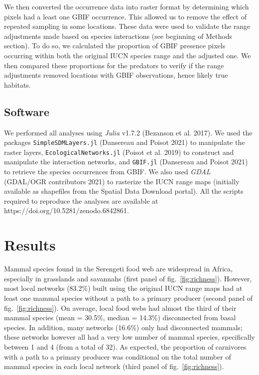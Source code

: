 \documentclass[10pt,oneside]{article}
\begin{document}
We then converted the occurrence data into raster format by determining
which pixels had a least one GBIF occurrence. This allowed us to remove
the effect of repeated sampling in some locations. These data were used
to validate the range adjustments made based on species interactions
(see beginning of Methods section). To do so, we calculated the
proportion of GBIF presence pixels occurring within both the original
IUCN species range and the adjusted one. We then compared these
proportions for the predators to verify if the range adjustments removed
locations with GBIF observations, hence likely true habitats.

\hypertarget{software}{%
\subsection{Software}\label{software}}

We performed all analyses using \emph{Julia} v1.7.2 (Bezanson et al.
2017). We used the packages \texttt{SimpleSDMLayers.jl} (Dansereau and
Poisot 2021) to manipulate the raster layers,
\texttt{EcologicalNetworks.jl} (Poisot et al. 2019) to construct and
manipulate the interaction networks, and \texttt{GBIF.jl} (Dansereau and
Poisot 2021) to retrieve the species occurrences from GBIF. We also used
\emph{GDAL} (GDAL/OGR contributors 2021) to rasterize the IUCN range
maps (initially available as shapefiles from the Spatial Data Download
portal). All the scripts required to reproduce the analyses are
available at https://doi.org/10.5281/zenodo.6842861.

\hypertarget{results}{%
\section{Results}\label{results}}

Mammal species found in the Serengeti food web are widespread in Africa,
especially in grasslands and savannahs (first panel of
fig.~\ref{fig:richness}). However, most local networks (83.2\%) built
using the original IUCN range maps had at least one mammal species
without a path to a primary producer (second panel of
fig.~\ref{fig:richness}). On average, local food webs had almost the
third of their mammal species (mean = 30.5\%, median = 14.3\%)
disconnected from basal species. In addition, many networks (16.6\%)
only had disconnected mammals; these networks however all had a very low
number of mammal species, specifically between 1 and 4 (from a total of
32). As expected, the proportion of carnivores with a path to a primary
producer was conditional on the total number of mammal species in each
local network (third panel of fig.~\ref{fig:richness}).
\end{document}

